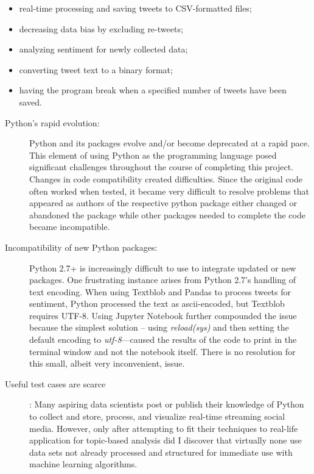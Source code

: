 \begin{itemize}	
\item real-time processing and saving tweets to CSV-formatted files;
\item decreasing data bias by excluding re-tweets;
\item analyzing sentiment for newly collected
data;
\item converting tweet text to a binary format;
\item having the program break when a specified
number of tweets have been saved.
\end{itemize}

\begin{description}
\item[Python's rapid evolution:] Python and its packages evolve and/or
  become deprecated at a rapid pace.  This element of using Python as
  the programming language posed significant challenges throughout the
  course of completing this project.  Changes in code compatibility
  created difficulties.  Since the original code often worked when
  tested, it became very difficult to resolve problems that appeared
  as authors of the respective python package either changed or
  abandoned the package while other packages needed to complete the
  code became incompatible.

\item[Incompatibility of new Python packages:] Python 2.7+ is
  increasingly difficult to use to integrate updated or new packages.
  One frustrating instance arises from Python 2.7's handling of text
  encoding.  When using Textblob and Pandas to process tweets for
  sentiment, Python processed the text as ascii-encoded, but Textblob
  requires UTF-8.  Using Jupyter Notebook further compounded the issue
  because the simplest solution – using \emph{reload(sys)} and then
  setting the default encoding to \emph{utf-8}—caused the results of
  the code to print in the terminal window and not the notebook
  itself.  There is no resolution for this small, albeit very
  inconvenient, issue.

\item[Useful test cases are scarce]: Many aspiring data scientists
  post or publish their knowledge of Python to collect and store,
  process, and visualize real-time streaming social media.  However,
  only after attempting to fit their techniques to real-life
  application for topic-based analysis did I discover that virtually
  none use data sets not already processed and structured for
  immediate use with machine learning algorithms.
\end{description}


